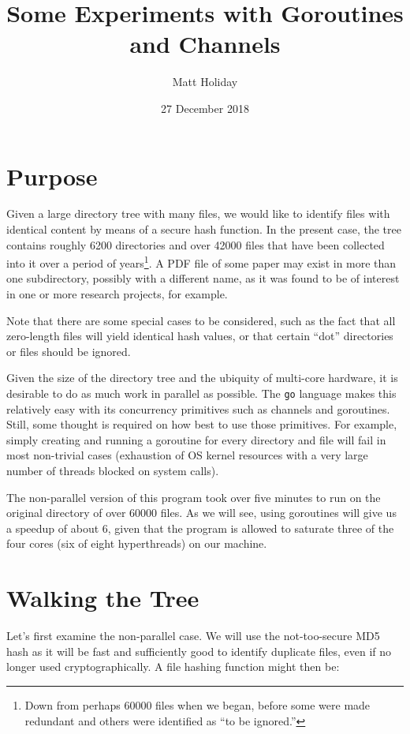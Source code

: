 \documentclass[12pt,notitlepage]{article}
\begin{document}
\title{Some Experiments with Goroutines and Channels}
\author{Matt Holiday}
\date{27 December 2018}
\maketitle
\thispagestyle{empty}

\section{Purpose}
Given a large directory tree with many files, we would like to identify files
with identical content by means of a secure hash function. In the present
case, the tree contains roughly 6200 directories and over 42000 files that
have been collected into it over a period of years\footnote{Down
from perhaps 60000 files when we began, before some were made redundant and
others were identified as ``to be ignored.''}.
A PDF file of some paper may exist in more than one subdirectory, possibly
with a different name, as it was found to be of interest in one or more
research projects, for example.

Note that there are some special cases to be considered, such as the fact
that all zero-length files will yield identical hash values, or that certain
``dot'' directories or files should be ignored.

Given the size of the directory tree and the ubiquity of multi-core hardware,
it is desirable to do as much work in parallel as possible. The \verb|go|
language makes this relatively easy with its concurrency primitives such as
channels and goroutines. Still, some thought is required on how best to use
those primitives. For example, simply creating and running a goroutine for
every directory and file will fail in most non-trivial cases (exhaustion
of OS kernel resources with a very large number of threads blocked on system
calls).

The non-parallel version of this program took over five minutes to run on the
original directory of over 60000 files. As we will see, using goroutines will
give us a speedup of about 6, given that the program is allowed to saturate
three of the four cores (six of eight hyperthreads) on our machine.

\section{Walking the Tree}
Let's first examine the non-parallel case. We will use the not-too-secure
MD5 hash as it will be fast and sufficiently good to identify duplicate files,
even if no longer used cryptographically. A file hashing function might then
be:
\end{document}
